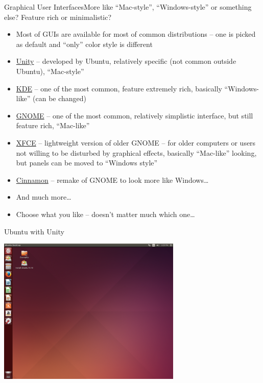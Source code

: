 \documentclass[compress, ucs, xelatex, 11pt, xcolor=svgnames,
  hyperref={
    bookmarks=true,
    unicode=true,
    colorlinks=true,
    pdftitle={Linux, command line and MetaCentrum},
    plainpages=false,
    pdfauthor={Vojtech Zeisek},
    pdfsubject={Course about use of Linux command line, writing shell scripts and using MetaCentrum of CESNET},
    pdfcreator={XeLaTeX},
    pdfkeywords={Linux, GNU, BASH, shell, command line, MetaCentrum},
    linkcolor=Red,
    anchorcolor=Blue,
    citecolor=Purple,
    filecolor=DodgerBlue,
    menucolor=DarkOrchid,
    urlcolor=DeepSkyBlue,
    pdftex},
  url={hyphens, lowtilde} %
  ]{beamer}
\begin{document}
\begin{frame}{Graphical User Interfaces}{More like ``Mac-style'', ``Windows-style'' or something else? Feature rich or minimalistic?}
\begin{itemize}
  \item Most of GUIs are available for most of common distributions -- one is picked as default and ``only'' color style is different
  \item \href{https://unity.ubuntu.com/}{Unity} -- developed by Ubuntu, relatively specific (not common outside Ubuntu), ``Mac-style''
  \item \href{https://www.kde.org/}{KDE} -- one of the most common, feature extremely rich, basically ``Windows-like'' (can be changed)
  \item \href{https://www.gnome.org/}{GNOME} -- one of the most common, relatively simplistic interface, but still feature rich, ``Mac-like''
  \item \href{http://xfce.org/}{XFCE} -- lightweight version of older GNOME -- for older computers or users not willing to be disturbed by graphical effects, basically ``Mac-like'' looking, but panels can be moved to ``Windows style''
  \item \href{http://cinnamon.linuxmint.com/}{Cinnamon} -- remake of GNOME to look more like Windows\ldots
  \item And much more\ldots
  \item Choose what you like -- doesn't matter much which one\ldots
\end{itemize}
\end{frame}

\begin{frame}{Ubuntu with Unity}
\begin{center}
  \includegraphics[height=7cm]{ubuntu.png}
\end{center}
\end{frame}
\end{document}
